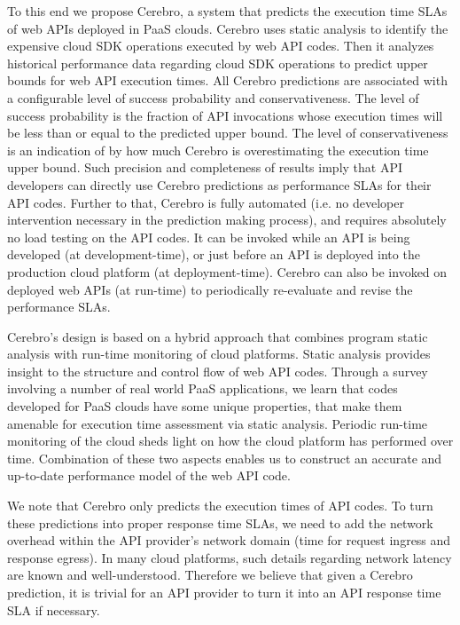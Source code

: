 To this end we propose Cerebro, a system that predicts the execution time SLAs of web APIs
deployed in PaaS clouds. Cerebro uses static analysis to identify the expensive cloud SDK operations
executed by web API codes. Then it analyzes historical performance data regarding cloud SDK
operations to predict upper bounds for web API execution times. All Cerebro predictions
are associated with a configurable level of success probability and conservativeness. The level of 
success probability is the fraction of API invocations whose execution times will be less than or equal to the
predicted upper bound. The level of conservativeness is an indication of by how much Cerebro
is overestimating the execution time upper bound. Such precision and completeness of results
imply that API developers can directly use Cerebro predictions as performance SLAs for their
API codes. Further to that, Cerebro is fully automated (i.e. no developer intervention necessary in
the prediction making process), and requires absolutely no load testing on the API codes. It can be
invoked while an API is being developed (at development-time), or just before an API is deployed
into the production cloud platform (at deployment-time). Cerebro can also be invoked on deployed
web APIs (at run-time) to periodically re-evaluate and revise the performance SLAs.

Cerebro's design is based on a hybrid approach that combines program static analysis with run-time
monitoring of cloud platforms. Static analysis provides insight to the structure and control flow of web
API codes. Through a survey involving a number
of real world PaaS applications, we learn that codes developed for PaaS clouds have
some unique properties, that make them amenable for execution time assessment via static 
analysis. Periodic run-time monitoring of the cloud sheds light on how
the cloud platform has performed over time. Combination of these two aspects enables
us to construct an accurate and up-to-date performance model of the web API code. 

We note that Cerebro only predicts the
execution times of API codes. To turn these predictions into proper response time SLAs, we need to
add the network overhead within the API provider's network domain (time for request ingress
and response egress). In many cloud platforms, such details regarding network latency are
known and well-understood. Therefore we believe that given a Cerebro prediction, it is trivial
for an API provider to turn it into an API response time SLA if necessary.

